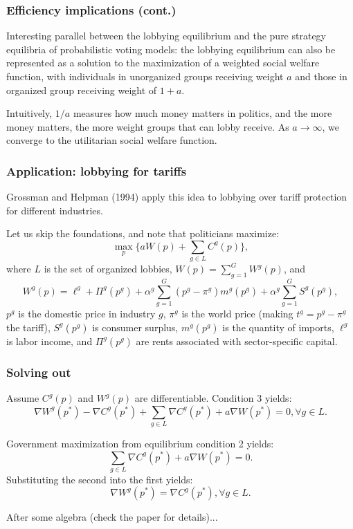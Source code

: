 \documentclass[11pt,aspectratio=169]{beamer}
\begin{document}
\begin{frame}

\frametitle{Efficiency implications (cont.)}

Interesting parallel between the lobbying equilibrium and the pure strategy equilibria of probabilistic voting models: the lobbying equilibrium can also be represented as a solution to the maximization of a weighted social welfare function, with individuals in unorganized groups receiving weight $a$ and those in organized group receiving weight of $1+a$. 

Intuitively, $1/a$ measures how much money matters in politics, and the more money matters, the more weight groups that can lobby receive. As $a\rightarrow \infty $, we converge to the utilitarian social welfare function.


\end{frame}



\begin{frame}

\frametitle{Application: lobbying for tariffs}

Grossman and Helpman (1994) apply this idea to lobbying over tariff protection for different industries. 

Let us skip the foundations, and note that politicians maximize: $$\max_{p} \bigg\{ aW(p) + \sum_{g\in L} C^g(p)\bigg\},$$ where $L$ is the set of organized lobbies, $W(p)=\sum_{g=1}^G W^g(p)$, and $$W^g(p) = \ell^g + \Pi^g(p^g) + \alpha^g \sum_{g=1}^G (p^g-\pi^g)m^g(p^g) + \alpha^g \sum_{g=1}^G S^g(p^g),$$ $p^g$ is the domestic price in industry $g$, $\pi^g$ is the world price (making $t^g=p^g-\pi^g$ the tariff), $S^g(p^g)$ is consumer surplus, $m^g(p^g)$ is the quantity of imports, $\ell^g$ is labor income, and $\Pi^g(p^g)$ are rents associated with sector-specific capital. 

\end{frame}




\begin{frame}

\frametitle{Solving out}

Assume $C^g(p)$ and $W^g(p)$ are differentiable. Condition 3 yields: $$\nabla W^g(p^*) - \nabla C^g(p^*) + \sum_{g\in L}\nabla C^g(p^*) + a\nabla W(p^*)=0, \forall g \in L.$$ 

\vspace{-10pt} Government maximization from equilibrium condition 2 yields: $$\sum_{g\in L}\nabla C^g(p^*) + a\nabla W(p^*)=0.$$ Substituting the second into the first yields: $$\nabla W^g(p^*) = \nabla C^g(p^*), \forall g \in L.$$ 

After some algebra (check the paper for details)...


\end{frame}
\end{document}
